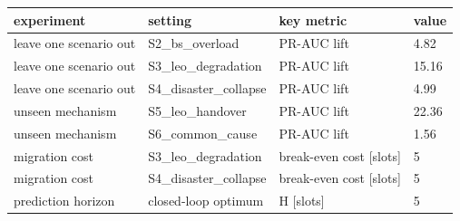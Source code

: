 \begin{tabular}{llll}
\toprule
experiment & setting & key metric & value \\
\midrule
leave one scenario out & S2\_bs\_overload & PR-AUC lift & 4.82 \\
leave one scenario out & S3\_leo\_degradation & PR-AUC lift & 15.16 \\
leave one scenario out & S4\_disaster\_collapse & PR-AUC lift & 4.99 \\
unseen mechanism & S5\_leo\_handover & PR-AUC lift & 22.36 \\
unseen mechanism & S6\_common\_cause & PR-AUC lift & 1.56 \\
migration cost & S3\_leo\_degradation & break-even cost [slots] & 5 \\
migration cost & S4\_disaster\_collapse & break-even cost [slots] & 5 \\
prediction horizon & closed-loop optimum & H [slots] & 5 \\
\bottomrule
\end{tabular}
